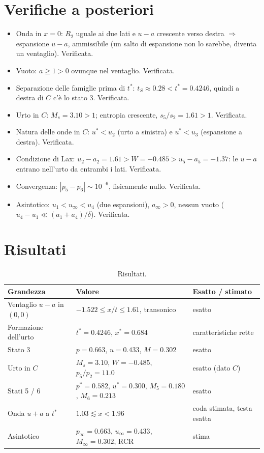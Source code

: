 \documentclass[11pt,a4paper]{article}
\newcommand{\uma}{u-a}
\newcommand{\upa}{u+a}
\newcommand{\Ms}{M_{s}}
\begin{document}
\section{Verifiche a posteriori}
\begin{itemize}
\item Onda in $x=0$: $R_2$ uguale ai due lati e $u-a$ crescente verso destra $\Rightarrow$ espansione $\uma$,
  ammissibile (un salto di espansione non lo sarebbe, diventa un ventaglio). Verificata.
\item Vuoto: $a\ge1>0$ ovunque nel ventaglio. Verificata.
\item Separazione delle famiglie prima di $t^*$: $t_S\approx\num{0.28}<t^*=\num{0.4246}$, quindi a destra di $C$
  c'è lo stato 3. Verificata.
\item Urto in $C$: $\Ms=\num{3.10}>1$; entropia crescente, $s_5/s_2=\num{1.61}>1$. Verificata.
\item Natura delle onde in $C$: $u^*<u_2$ (urto a sinistra) e $u^*<u_3$ (espansione a destra). Verificata.
\item Condizione di Lax: $u_2-a_2=\num{1.61}>W=-\num{0.485}>u_5-a_5=-\num{1.37}$: le $\uma$ entrano nell'urto da
  entrambi i lati. Verificata.
\item Convergenza: $|p_5-p_6|\sim10^{-6}$, fisicamente nullo. Verificata.
\item Asintotico: $u_1<u_\infty<u_4$ (due espansioni), $a_\infty>0$, nessun vuoto
  ($u_4-u_1\ll(a_1+a_4)/\delta$). Verificata.
\end{itemize}

\section{Risultati}
\begin{table}[H]
  \centering
  \small
  \begin{tabular}{lp{6.6cm}p{3.2cm}}
    \toprule
    Grandezza & Valore & Esatto / stimato \\
    \midrule
    Ventaglio $\uma$ in $(0,0)$ & $-\num{1.522}\le x/t\le\num{1.61}$, transonico & esatto \\
    Formazione dell'urto & $t^*=\num{0.4246}$, $x^*=\num{0.684}$ & caratteristiche rette \\
    Stato 3 & $p=\num{0.663}$, $u=\num{0.433}$, $M=\num{0.302}$ & esatto \\
    Urto in $C$ & $\Ms=\num{3.10}$, $W=-\num{0.485}$, $p_5/p_2=\num{11.0}$ & esatto (dato $C$) \\
    Stati 5 / 6 & $p^*=\num{0.582}$, $u^*=\num{0.300}$, $M_5=\num{0.180}$, $M_6=\num{0.213}$ & esatto \\
    Onda $\upa$ a $t^*$ & $\num{1.03}\lesssim x<\num{1.96}$ & coda stimata, testa esatta \\
    Asintotico & $p_\infty=\num{0.663}$, $u_\infty=\num{0.433}$, $M_\infty=\num{0.302}$, RCR & stima \\
    \bottomrule
  \end{tabular}
  \caption{Risultati.}
\end{table}
\end{document}
